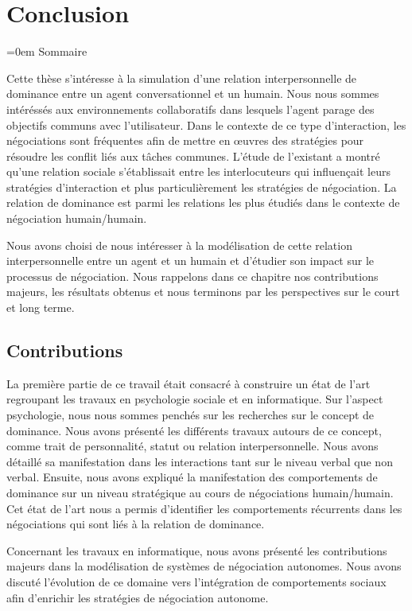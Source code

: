 \chapter{Conclusion}

\begingroup
\parindent=0em
\large Sommaire
\localtableofcontents 
\clearpage
\endgroup

Cette thèse s'intéresse à la simulation d'une relation interpersonnelle de dominance entre un agent conversationnel et un humain.
Nous nous sommes intéréssés aux environnements collaboratifs dans lesquels l'agent parage des objectifs communs avec l'utilisateur. Dans le contexte de ce type d'interaction, les négociations sont fréquentes afin de mettre en œuvres des stratégies pour résoudre les conflit liés aux tâches communes. 
L'étude de l'existant a montré qu'une relation sociale s'établissait entre les interlocuteurs qui influençait leurs stratégies d'interaction et plus particulièrement les stratégies de négociation. La relation de dominance est parmi les relations les plus étudiés dans le contexte de négociation humain/humain. 

Nous avons choisi de nous intéresser à la modélisation de cette relation interpersonnelle entre un agent et un humain et d'étudier son impact sur le processus de négociation.  Nous rappelons dans ce chapitre nos contributions majeurs, les résultats obtenus et nous terminons par les perspectives sur le court et long terme. 

 
\section{Contributions}
	La première partie de ce travail était consacré à construire un état de l'art regroupant les travaux en psychologie sociale et en informatique.  Sur l'aspect psychologie, nous nous sommes penchés sur les recherches sur le concept de dominance. Nous avons présenté les différents travaux autours de ce concept, comme trait de personnalité, statut ou relation interpersonnelle.
	Nous avons détaillé sa manifestation dans les interactions tant sur le niveau verbal que non verbal. Ensuite, nous avons expliqué la manifestation des comportements de dominance sur un niveau stratégique au cours de négociations humain/humain.
	Cet état de l'art nous a permis d'identifier les comportements récurrents dans les négociations qui sont liés à la relation de dominance.
	
	Concernant les travaux en informatique, nous avons présenté les contributions majeurs dans la modélisation de systèmes de négociation autonomes. Nous avons discuté l'évolution de ce domaine vers l'intégration de comportements sociaux afin d'enrichir les stratégies de négociation autonome. 
	
